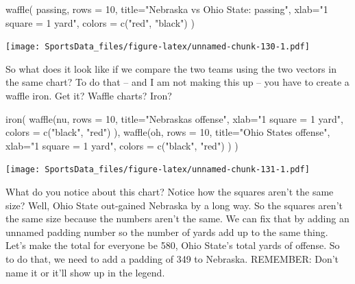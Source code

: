 \documentclass[
]{book}
\newenvironment{Shaded}{\begin{snugshade}}{\end{snugshade}}
\newcommand{\AttributeTok}[1]{\textcolor[rgb]{0.77,0.63,0.00}{#1}}
\newcommand{\DecValTok}[1]{\textcolor[rgb]{0.00,0.00,0.81}{#1}}
\newcommand{\FunctionTok}[1]{\textcolor[rgb]{0.00,0.00,0.00}{#1}}
\newcommand{\NormalTok}[1]{#1}
\newcommand{\StringTok}[1]{\textcolor[rgb]{0.31,0.60,0.02}{#1}}
\begin{document}
\begin{Shaded}
\begin{Highlighting}[]
\FunctionTok{waffle}\NormalTok{(}
\NormalTok{        passing, }
        \AttributeTok{rows =} \DecValTok{10}\NormalTok{, }
        \AttributeTok{title=}\StringTok{"Nebraska vs Ohio State: passing"}\NormalTok{, }
        \AttributeTok{xlab=}\StringTok{"1 square = 1 yard"}\NormalTok{, }
        \AttributeTok{colors =} \FunctionTok{c}\NormalTok{(}\StringTok{"red"}\NormalTok{, }\StringTok{"black"}\NormalTok{)}
\NormalTok{)}
\end{Highlighting}
\end{Shaded}

\texttt{[image: SportsData\_files/figure-latex/unnamed-chunk-130-1.pdf]}

So what does it look like if we compare the two teams using the two vectors in the same chart? To do that -- and I am not making this up -- you have to create a waffle iron. Get it? Waffle charts? Iron?

\begin{Shaded}
\begin{Highlighting}[]
\FunctionTok{iron}\NormalTok{(}
 \FunctionTok{waffle}\NormalTok{(nu, }
        \AttributeTok{rows =} \DecValTok{10}\NormalTok{, }
        \AttributeTok{title=}\StringTok{"Nebraska\textquotesingle{}s offense"}\NormalTok{, }
        \AttributeTok{xlab=}\StringTok{"1 square = 1 yard"}\NormalTok{, }
        \AttributeTok{colors =} \FunctionTok{c}\NormalTok{(}\StringTok{"black"}\NormalTok{, }\StringTok{"red"}\NormalTok{)}
\NormalTok{        ),}
 \FunctionTok{waffle}\NormalTok{(oh, }
        \AttributeTok{rows =} \DecValTok{10}\NormalTok{, }
        \AttributeTok{title=}\StringTok{"Ohio State\textquotesingle{}s offense"}\NormalTok{, }
        \AttributeTok{xlab=}\StringTok{"1 square = 1 yard"}\NormalTok{, }
        \AttributeTok{colors =} \FunctionTok{c}\NormalTok{(}\StringTok{"black"}\NormalTok{, }\StringTok{"red"}\NormalTok{)}
\NormalTok{        )}
\NormalTok{)}
\end{Highlighting}
\end{Shaded}

\texttt{[image: SportsData\_files/figure-latex/unnamed-chunk-131-1.pdf]}

What do you notice about this chart? Notice how the squares aren't the same size? Well, Ohio State out-gained Nebraska by a long way. So the squares aren't the same size because the numbers aren't the same. We can fix that by adding an unnamed padding number so the number of yards add up to the same thing. Let's make the total for everyone be 580, Ohio State's total yards of offense. So to do that, we need to add a padding of 349 to Nebraska. REMEMBER: Don't name it or it'll show up in the legend.
\end{document}
